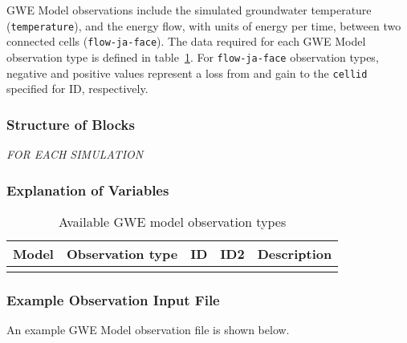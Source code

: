 
GWE Model observations include the simulated groundwater temperature (\texttt{temperature}), and the energy flow, with units of energy per time, between two connected cells (\texttt{flow-ja-face}). The data required for each GWE Model observation type is defined in table~\ref{table:gweobstype}. For \texttt{flow-ja-face} observation types, negative and positive values represent a loss from and gain to the \texttt{cellid} specified for ID, respectively.

\subsubsection{Structure of Blocks}
\vspace{5mm}

\noindent \textit{FOR EACH SIMULATION}



\subsubsection{Explanation of Variables}
\begin{description}

\end{description}


\begin{longtable}{p{2cm} p{2.75cm} p{2cm} p{1.25cm} p{7cm}}
\caption{Available GWE model observation types} \tabularnewline

\hline
\hline
\textbf{Model} & \textbf{Observation type} & \textbf{ID} & \textbf{ID2} & \textbf{Description} \\
\hline
\endhead

\hline
\endfoot


\label{table:gweobstype}
\end{longtable}

\vspace{5mm}
\subsubsection{Example Observation Input File}

An example GWE Model observation file is shown below.



